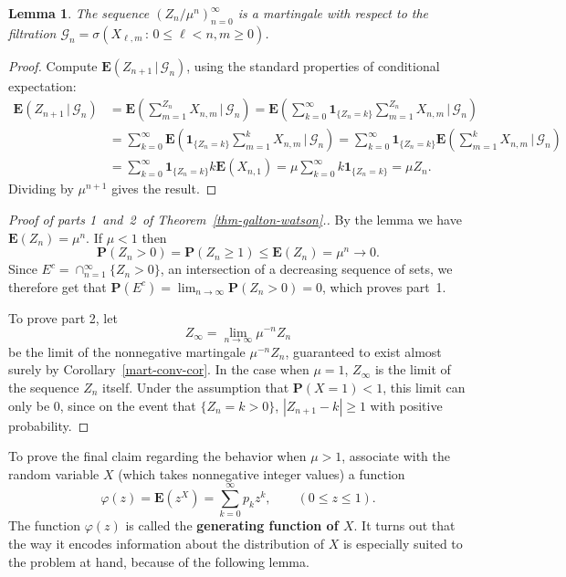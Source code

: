 \documentclass[12pt]{article}
\newtheorem{lem}[thm]{Lemma}
\newcommand{\prob}{\mathbf{P}}
\newcommand{\expec}{\mathbf{E}}
\newcommand{\condexp}[2]{\expec\left(#1\,|\,#2\right)}
\newcommand{\ind}{\textbf{1}}
\theoremstyle{example}
\begin{document}
\begin{lem}
The sequence $ (Z_n/\mu^n)_{n=0}^\infty $ is a martingale with respect to the filtration $\mathcal{G}_n = \sigma(X_{\ell,m}\,:\, 0\le \ell< n, m\ge 0)$.
\end{lem}

\begin{proof} Compute $\condexp{Z_{n+1}}{\mathcal{G}_n}$, using the standard properties of conditional expectation: 
\begin{align*}
\condexp{Z_{n+1}}{\mathcal{G}_n} &= \condexp{\sum_{m=1}^{Z_{n}} X_{n,m}}{\mathcal{G}_n}
= 
\condexp{ \sum_{k=0}^\infty  \ind_{\{Z_n=k\}} \sum_{m=1}^{Z_{n}} X_{n,m}}{\mathcal{G}_n}
\\
&= \sum_{k=0}^\infty 
\condexp{ \ind_{\{Z_n=k\}} \sum_{m=1}^{k} X_{n,m}}{\mathcal{G}_n}
= \sum_{k=0}^\infty \ind_{\{Z_n=k\}}
\condexp{  \sum_{m=1}^{k} X_{n,m}}{\mathcal{G}_n}
\\ &= 
 \sum_{k=0}^\infty \ind_{\{Z_n=k\}} k \expec(X_{n,1}) = \mu \sum_{k=0}^\infty k \ind_{\{Z_n=k\}} = \mu Z_n.
\end{align*}
Dividing by $\mu^{n+1}$ gives the result.
\end{proof}

\begin{proof}[Proof of parts 1~and~2~of Theorem~\ref{thm-galton-watson}.]
By the lemma we have $\expec(Z_n)=\mu^n$. If $\mu<1$ then 
$$\prob(Z_n>0)=\prob(Z_n\ge 1)\le \expec(Z_n) = \mu^n \to 0. $$
Since $E^c = \cap_{n=1}^\infty \{ Z_n>0 \}$, an intersection of a decreasing sequence of sets, we therefore get that $\prob(E^c)=\displaystyle\lim_{n\to\infty} \prob(Z_n>0)=0$, which proves part~1.

To prove part 2, let
$$ Z_\infty = \lim_{n\to\infty} \mu^{-n} Z_n $$
be the limit of the nonnegative martingale $\mu^{-n} Z_n$, guaranteed to exist almost surely by Corollary~\ref{mart-conv-cor}. In the case when $\mu=1$, $Z_\infty$ is the limit of the sequence $Z_n$ itself. Under the assumption that $\prob(X=1)<1$, this limit can only be $0$, since on the event that $\{Z_n=k>0\}$, $|Z_{n+1}-k|\ge 1$ with positive probability.
\end{proof}

To prove the final claim regarding the behavior when $\mu>1$, associate with the random variable $X$ (which takes nonnegative integer values) a function
$$ \varphi(z) = \expec(z^X) = \sum_{k=0}^\infty p_k z^k, \qquad (0\le z\le 1). $$
The function $\varphi(z)$ is called the \textbf{generating function of $X$}. It turns out that the way it encodes information about the distribution of $X$ is especially suited to the problem at hand, because of the following lemma.
\end{document}
